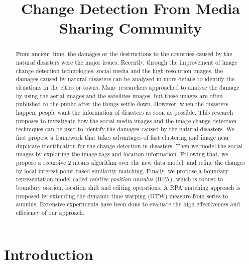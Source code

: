 \documentclass[runningheads,a4paper]{llncs}
\newcommand{\eat}[1]{}
\begin{document}
\mainmatter  %

\title{Change Detection From Media Sharing Community }

%
%
\eat{
\author{Naoki Kito
\and Dr.Xiangmin Zhou\and Assoc Prof. James Thom}
}
\maketitle


\begin{abstract}
From ancient time, the damages or the destructions to the countries caused by the natural disasters were the major issues. 
Recently, through the improvement of image change detection technologies, social media and the high-resolution images, the damages caused by natural disasters can be analysed in more details to identify the situations in the cities or towns. Many researchers approached to analyse the damage by using the aerial images and the satellites images, but these images are often published to the public after the things settle down. However, when the disasters happen, people want the information of disasters as soon as possible. This research proposes to investigate how the social media images and the image change detection techniques can be used to identify the damages caused by the natural disasters. We first propose a framework that takes advantages of fast clustering and image near duplicate identification for the change detection in disasters. Then we model the social images by exploiting the image tags and location information. Following that, we propose a recursive 2 means algorithm over the new data model, and refine the changes by local interest point-based similarity matching. Finally, we propose a boundary representation model called \textit{relative position annulus} (RPA), which is robust to boundary oration, location shift and editing operations. A RPA matching approach is proposed by extending the dynamic time warping (DTW) measure from series to annulus. Extensive experiments have been done to evaluate the high effectiveness and efficiency of our approach.
\end{abstract}


\section{Introduction}
\end{document}
